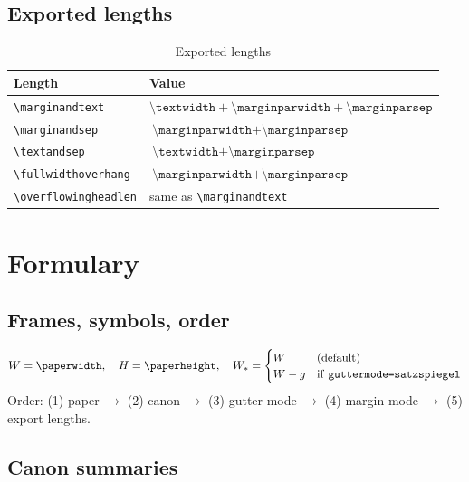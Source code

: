\documentclass[11pt, twoside, openany]{book}
\newcommand{\cmd}[1]{\texttt{\textbackslash #1}}
\begin{document}
\section{Exported lengths}\label{sec:lengths}

\begin{table}
	\centering
	\caption{Exported lengths}
	\label{tab:exportlengths}
	\begin{tabular}{ll}
		\textbf{Length}          & \textbf{Value}                                                \\
		\hline
		\cmd{marginandtext}      & $\cmd{textwidth} + \cmd{marginparwidth} + \cmd{marginparsep}$ \\
		\cmd{marginandsep}       & $\cmd{marginparwidth} + \cmd{marginparsep}$                   \\
		\cmd{textandsep}         & $\cmd{textwidth} + \cmd{marginparsep}$                        \\
		\cmd{fullwidthoverhang}  & $\cmd{marginparwidth} + \cmd{marginparsep}$                   \\
		\cmd{overflowingheadlen} & same as \cmd{marginandtext}                                   \\
	\end{tabular}
\end{table}

\printbibliography


\appendix
\chapter{Formulary}\label{chapter:formulary}


\section*{Frames, symbols, order}\label{sec:formulary1}
\[
	W = \cmd{paperwidth},\quad H = \cmd{paperheight},\quad
	W_\ast = \begin{cases}
	W & \text{(default)}\\
	W-g & \text{if \texttt{guttermode=satzspiegel}}
	\end{cases}
\]
Order: (1) paper $\to$ (2) canon $\to$ (3) gutter mode $\to$ (4) margin mode $\to$ (5) export lengths.

\section*{Canon summaries}\label{sec:formulary2}
\end{document}

